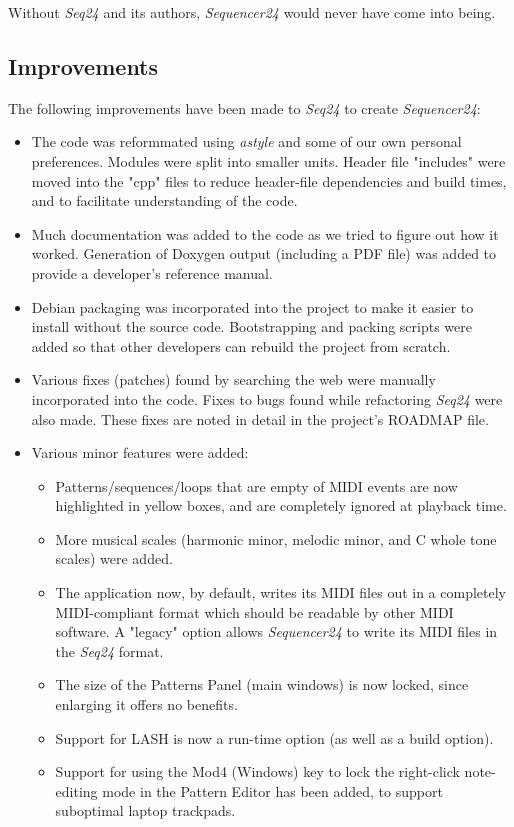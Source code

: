 \documentclass[
 11pt,
 twoside,
 a4paper,
 headinclude,
 footinclude,
 final                                 %
]{article}
\begin{document}
   Without \textsl{Seq24} and its authors, \textsl{Sequencer24} would never
   have come into being.

\subsection{Improvements}
\label{subsec:improvements}

   The following improvements have been made to \textsl{Seq24} to
   create \textsl{Sequencer24}:

   \begin{itemize}
      \item The code was reformmated using \textsl{astyle} and some of our
         own personal preferences.  Modules were split into smaller units.
         Header file "includes" were moved into the "cpp" files to reduce
         header-file dependencies and build times, and to facilitate
         understanding of the code.
      \item Much documentation was added to the code as we tried to figure
         out how it worked.  Generation of Doxygen output (including a PDF
         file) was added to provide a developer's reference manual.
      \item Debian packaging was incorporated into the project to make it
         easier to install without the source code.  Bootstrapping and
         packing scripts were added so that other developers can rebuild the
         project from scratch.
      \item Various fixes (patches) found by searching the web were manually
         incorporated into the code.  Fixes to bugs found while refactoring
         \textsl{Seq24} were also made.  These fixes are noted in detail in
         the project's ROADMAP file.
      \item Various minor features were added:
      \begin{itemize}
         \item Patterns/sequences/loops that are empty of MIDI events are
            now highlighted in yellow boxes, and are completely ignored at
            playback time.
         \item More musical scales (harmonic minor, melodic minor, and
            C whole tone scales) were added.
         \item The application now, by default, writes its MIDI files out
            in a completely MIDI-compliant format which should be readable
            by other MIDI software.  A "legacy" option allows
            \textsl{Sequencer24} to write its MIDI files in the
            \textsl{Seq24} format.
         \item The size of the Patterns Panel (main windows) is now locked,
            since enlarging it offers no benefits.
         \item Support for LASH is now a run-time option (as well as a build
            option).
         \item Support for using the Mod4 (Windows) key to lock the
            right-click note-editing mode in the Pattern Editor has been
            added, to support suboptimal laptop trackpads.
      \end{itemize}
   \end{itemize}
\end{document}
